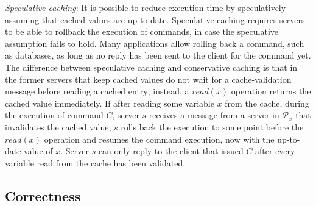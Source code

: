 \documentclass[10pt, conference, compsocconf, letterpaper]{IEEEtranv17}
\newcommand{\ppm}{\mathcal{P}}
\begin{document}
\emph{Speculative caching}: It is possible to reduce execution time by speculatively assuming that cached values are up-to-date. 
Speculative caching requires servers to be able to rollback the execution of commands, in case the speculative assumption fails to hold. 
Many applications allow rolling back a command, such as databases, as long as no reply has been sent to the client for the command yet. 
The difference between speculative caching and conservative caching is that in the former servers that keep cached values do not wait for a cache-validation message before reading a cached entry; instead, a $read(x)$ operation returns the cached value immediately. 
If after reading some variable $x$ from the cache, during the execution of command $C$, server $s$ receives a message from a server in $\ppm_x$ that invalidates the cached value, $s$ rolls back the execution to some point before the $read(x)$ operation and resumes the command execution, now with the up-to-date value of $x$. 
Server $s$ can only reply to the client that issued $C$ after every variable read from the cache has been validated.


\subsection{Correctness}
\label{sec:correctness}
\end{document}
